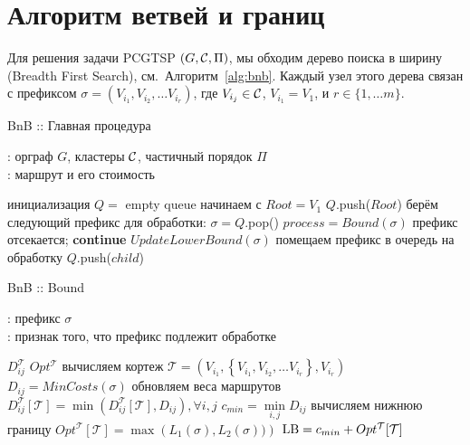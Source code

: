 \section{Алгоритм ветвей и границ}\label{sec:SA}

Для решения задачи PCGTSP 
$(G,\mathcal{C},\Pi)$,
мы обходим дерево поиска в ширину
(Breadth First Search),
см.~Алгоритм~\ref{alg:bnb}.
Каждый узел этого дерева связан с префиксом
$\sigma = \left(V_{i_1}, V_{i_2}, \dots V_{i_r} \right)$,
где
$V_{i_j} \in \mathcal{C}$,
$V_{i_1} = V_1$,
и
$r \in \{{1, \dots m}\}$.

\begin{algorithm}[]
\caption{BnB :: Главная процедура}\label{alg:bnb}
\hspace*{\algorithmicindent}{\bf Вход}: орграф $G$, кластеры $\mathcal{C}$, частичный порядок $\Pi$ \\
\hspace*{\algorithmicindent}{\bf Выход}: маршрут и его стоимость
\begin{algorithmic}[1]
    \STATE инициализация $Q =$ empty queue
    \STATE начинаем с $Root = V_1$
    \STATE $Q$.push($Root$)
        \STATE берём следующий префикс для обработки: $\sigma = Q$.pop()
        \STATE $process = Bound(\sigma)$
            \STATE префикс отсекается; {\bf continue}
        \ENDIF
        \STATE $UpdateLowerBound(\sigma)$
            \STATE помещаем префикс в очередь на обработку $Q$.push($child$)
        \ENDFOR
    \ENDWHILE
\end{algorithmic}
\end{algorithm}

\begin{algorithm}[]
\caption{BnB :: Bound}\label{alg:bnb:bound}
\hspace*{\algorithmicindent}{\bf Вход}: префикс $\sigma$ \\
\hspace*{\algorithmicindent}{\bf Выход}: признак того, что префикс подлежит обработке
\begin{algorithmic}[1]
     $D_{ij}^{\mathcal T}$
     $Opt^{\mathcal T}$
    \STATE вычисляем кортеж $\mathcal T = \left(V_{i_1},
        \left\{V_{i_1}, V_{i_2}, \dots V_{i_r}\right\}, V_{i_r} \right)$
        \label{alg:bnb:bound:key}
    \STATE $D_{ij} = MinCosts(\sigma)$
        \label{alg:bnb:bound:pfx}
        \RETURN \FALSE
    \ENDIF
    \STATE  обновляем веса маршрутов $D_{ij}^{\mathcal T}[\mathcal T]  = \min \left(
        D_{ij}^{\mathcal T}[\mathcal T], D_{ij} \right),
        \forall i, j$
    \STATE  $c_{min} = \min\limits_{i, j} D_{ij}$
        \STATE вычисляем нижнюю границу $Opt^{\mathcal T}[\mathcal T] = \max\left(L_1(\sigma), L_2(\sigma))\right)$
        \label{alg:bnb:bound:sfx}
    \ENDIF
    \STATE $\mathrm{LB} = c_{min} + Opt^{\mathcal T}[\mathcal T]$
        \label{alg:bnb:bound:lb}
    \IF{$\LB > \UB$}
        \RETURN \FALSE
    \ENDIF
    \RETURN \TRUE
\end{algorithmic}
\end{algorithm}

